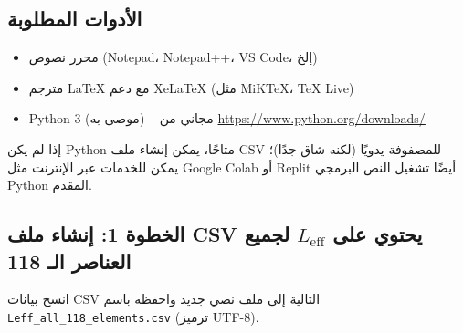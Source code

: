 \documentclass[12pt,a4paper]{article}
\begin{document}
	\subsection*{الأدوات المطلوبة}
	\begin{itemize}
		\item محرر نصوص (Notepad، Notepad++، VS Code، إلخ)
		\item مترجم LaTeX مع دعم XeLaTeX (مثل MiKTeX، TeX Live)
		\item Python 3 (موصى به) – مجاني من \url{https://www.python.org/downloads/}
	\end{itemize}
	إذا لم يكن Python متاحًا، يمكن إنشاء ملف CSV للمصفوفة يدويًا (لكنه شاق جدًا)؛ يمكن للخدمات عبر الإنترنت مثل Google Colab أو Replit أيضًا تشغيل النص البرمجي Python المقدم.
	
	\subsection*{الخطوة 1: إنشاء ملف CSV يحتوي على \(L_{\mathrm{eff}}\) لجميع العناصر الـ 118}
	انسخ بيانات CSV التالية إلى ملف نصي جديد واحفظه باسم \texttt{Leff\_all\_118\_elements.csv} (ترميز UTF-8).
	
\end{document}
